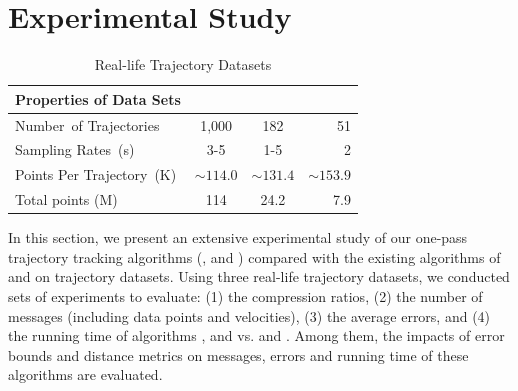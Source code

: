 \section{Experimental Study}
\label{sec-exp}


\begin{table}[tb!]
	\renewcommand{\arraystretch}{1.20}
	\caption{\small Real-life Trajectory Datasets}
	\vspace{-1.5ex}
	\centering
	\footnotesize
	\begin{tabular}{|l|c|c|r|}
		\hline
		\bf{ Properties of Data Sets} & \sercar      &\geolife   &\mopsi \\
		\hline
		{Number\ of Trajectories}	&1,000	    &182	    & 51  \\
		\hline
		 {Sampling Rates\ (s)} &3-5  & 1-5 & 2 \\
		\hline
		{Points Per Trajectory\ (K)}  &	$\sim114.0$    &$\sim131.4$	    & $\sim153.9$ \\
		\hline
		 {Total points (M)} &114   	    	&24.2    &7.9\\
		\hline
	\end{tabular}
	\label{tab:datasets}
	\vspace{-2ex}
\end{table}


In this section, we present an extensive experimental study of our one-pass trajectory tracking algorithms (\citt, \sitt and \bitt) compared with the
existing algorithms of \ldrh and \grts on trajectory datasets. Using three real-life trajectory datasets, we conducted sets of experiments to evaluate:
(1) the compression ratios,
(2) the number of messages (including data points and velocities),
(3) the average errors, and
(4) the running time of algorithms \citt, \sitt and \bitt vs. \ldrh and \grts. 
Among them, the impacts of error bounds and distance metrics on messages, errors and running time of these algorithms are evaluated. 




